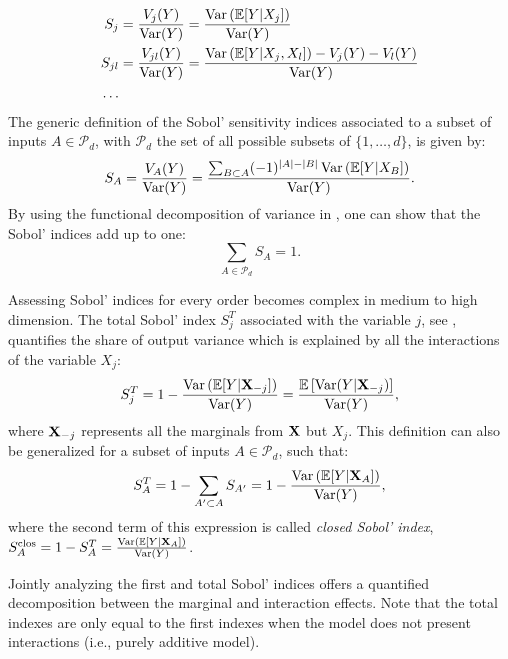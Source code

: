 \begin{align}
    S_j &= \frac{V_j(Y)}{\operatorname{Var}(Y)} = \frac{\operatorname{Var}\left(\mathbb{E}[Y|X_j]\right)}{\operatorname{Var}(Y)}\\
    S_{jl} &= \frac{V_{jl}(Y)}{\operatorname{Var}(Y)} = \frac{\operatorname{Var}\left(\mathbb{E}[Y|X_j, X_l]\right) - V_j(Y) - V_l(Y)}{\operatorname{Var}(Y)}\\
    \dots
    \label{eq:sobol_first}
\end{align}
The generic definition of the Sobol' sensitivity indices associated to a subset of inputs $A \in \mathcal{P}_d$, with $\mathcal{P}_d$ the set of all possible subsets of $\{1, \dots, d\}$, is given by:
\begin{equation}
    S_A = \frac{V_A(Y)}{\operatorname{Var}(Y)} = \frac{\sum_{B \subset A} (-1)^{|A| - |B|} \operatorname{Var}\left(\mathbb{E}[Y|X_B]\right)}{\operatorname{Var}(Y)}.
    \label{eq:sobol}
\end{equation}
By using the functional decomposition of variance in , one can show that the Sobol' indices add up to one: 
\begin{equation}
    \sum_{A \in \mathcal{P}_d} S_A = 1.
\end{equation}

Assessing Sobol' indices for every order becomes complex in medium to high dimension. 
The total Sobol' index $S_j^T$ associated with the variable $j$, see \citet{saltelli_2008}, quantifies the share of output variance which is explained by all the interactions of the variable $X_j$:
\begin{equation}
    S_j^T = 1 - \frac{\operatorname{Var}\left(\mathbb{E}[Y|{\bf X}_{-j}]\right)}{\operatorname{Var}(Y)} = \frac{\mathbb{E}\left[\operatorname{Var}(Y|{\bf X}_{-j})\right]}{\operatorname{Var}(Y)},
    \label{eq:sobol_total}
\end{equation}
where ${\bf X}_{-j}$ represents all the marginals from ${\bf X}$ but $X_j$.
This definition can also be generalized for a subset of inputs $A \in \mathcal{P}_d$, such that:
\begin{equation}
    S_A^T = 1 - \sum_{A' \subset A} S_{A'} = 1 - \frac{\operatorname{Var}\left(\mathbb{E}[Y|{\bf X}_{A}]\right)}{\operatorname{Var}(Y)},
\end{equation}
where the second term of this expression is called \textit{closed Sobol' index}, $S_A^{\mathrm{clos}} = 1 - S_A^T = \frac{\operatorname{Var}\left(\mathbb{E}[Y|{\bf X}_{A}]\right)}{\operatorname{Var}(Y)}$.

Jointly analyzing the first and total Sobol' indices offers a quantified decomposition between the marginal and interaction effects. 
Note that the total indexes are only equal to the first indexes when the model does not present interactions (i.e., purely additive model).

